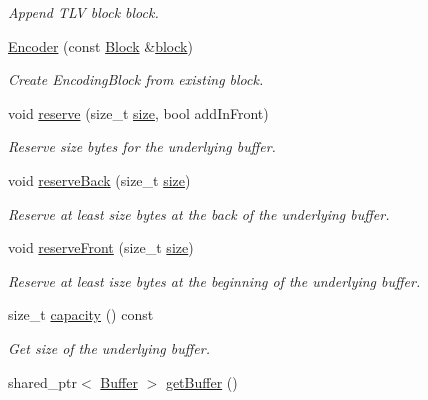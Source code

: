 \begin{DoxyCompactItemize}
\begin{DoxyCompactList}\small\item\em Append T\+LV block {\ttfamily block}. \end{DoxyCompactList}\item 
\hyperlink{classndn_1_1encoding_1_1Encoder_aaf7a731bc554b93454fe1d4006aa4d5f}{Encoder} (const \hyperlink{classndn_1_1Block}{Block} \&\hyperlink{classndn_1_1encoding_1_1Encoder_a37a3f9744f1fe2be7b35a5fd7827bd3b}{block})
\begin{DoxyCompactList}\small\item\em Create Encoding\+Block from existing block. \end{DoxyCompactList}\item 
void \hyperlink{classndn_1_1encoding_1_1Encoder_a076c8f06a4cb772896621e3737e34ede}{reserve} (size\+\_\+t \hyperlink{classndn_1_1encoding_1_1Encoder_ae5a65e998b6f12594897b30f9cf90943}{size}, bool add\+In\+Front)
\begin{DoxyCompactList}\small\item\em Reserve {\ttfamily size} bytes for the underlying buffer. \end{DoxyCompactList}\item 
void \hyperlink{classndn_1_1encoding_1_1Encoder_ade19fdbfcae1a23d1fca14e075cde0fa}{reserve\+Back} (size\+\_\+t \hyperlink{classndn_1_1encoding_1_1Encoder_ae5a65e998b6f12594897b30f9cf90943}{size})
\begin{DoxyCompactList}\small\item\em Reserve at least {\ttfamily size} bytes at the back of the underlying buffer. \end{DoxyCompactList}\item 
void \hyperlink{classndn_1_1encoding_1_1Encoder_a2d9fae4b2cf5c6b3a7631f71954cec6a}{reserve\+Front} (size\+\_\+t \hyperlink{classndn_1_1encoding_1_1Encoder_ae5a65e998b6f12594897b30f9cf90943}{size})
\begin{DoxyCompactList}\small\item\em Reserve at least {\ttfamily isze} bytes at the beginning of the underlying buffer. \end{DoxyCompactList}\item 
size\+\_\+t \hyperlink{classndn_1_1encoding_1_1Encoder_adadea72523c770590a8a350d78cd6d89}{capacity} () const\hypertarget{classndn_1_1encoding_1_1Encoder_adadea72523c770590a8a350d78cd6d89}{}\label{classndn_1_1encoding_1_1Encoder_adadea72523c770590a8a350d78cd6d89}

\begin{DoxyCompactList}\small\item\em Get size of the underlying buffer. \end{DoxyCompactList}\item 
shared\+\_\+ptr$<$ \hyperlink{classndn_1_1Buffer}{Buffer} $>$ \hyperlink{classndn_1_1encoding_1_1Encoder_a9755ef423314e14568f8766b3f3890f1}{get\+Buffer} ()\hypertarget{classndn_1_1encoding_1_1Encoder_a9755ef423314e14568f8766b3f3890f1}{}\label{classndn_1_1encoding_1_1Encoder_a9755ef423314e14568f8766b3f3890f1}


\end{DoxyCompactItemize}
